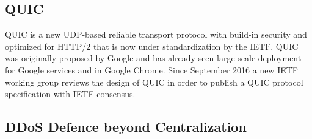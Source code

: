 \subsection{QUIC}

QUIC is a new UDP-based reliable transport protocol with build-in security and
optimized for HTTP/2 that is now under standardization by the IETF. QUIC was
originally proposed by Google and has already seen large-scale deployment for
Google services and in Google Chrome. Since September 2016 a new IETF working
group reviews the design of QUIC in order to publish a QUIC protocol
specification \cite{draft-ietf-quic-transport} with IETF consensus.




\subsection{DDoS Defence beyond Centralization}

